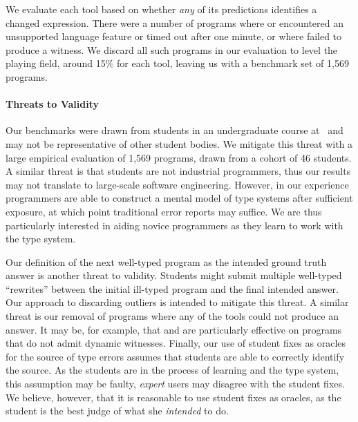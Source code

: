We evaluate each tool based on whether \emph{any} of its predictions
identifies a changed expression.
%
There were a number of programs where \mycroft or \sherrloc
encountered an unsupported language feature or timed out after one
minute, or where \toolname failed to produce a witness.
%
We discard all such programs in our evaluation to level the playing
field, around 15\% for each tool, leaving us with a benchmark set of
1,569 programs.

\paragraph{Threats to Validity}
Our benchmarks were drawn from students in an undergraduate course
at \ucsdbench\ and may not be representative of other student bodies.
%
We mitigate this threat with a large empirical evaluation of 1,569
programs, drawn from a cohort of 46 students.
%
A similar threat is that students are not industrial programmers, thus
our results may not translate to large-scale software engineering.
%
%
However, in our experience programmers are able to construct a mental
model of type systems after sufficient exposure, at which point
traditional error reports may suffice.
%
We are thus particularly interested in aiding novice programmers as
they learn to work with the type system.

Our definition of the next well-typed program as the intended ground
truth answer is another threat to validity. Students might submit
multiple well-typed ``rewrites'' between the initial ill-typed program
and the final intended answer.
%
Our approach to discarding outliers is intended to mitigate this threat.
%
A similar threat is our removal of programs where any of the tools could
not produce an answer.
%
It may be, for example, that \mycroft and \sherrloc are particularly
effective on programs that do not admit dynamic witnesses.
%
Finally, our use of student fixes as oracles for the source of type
errors assumes that students are able to correctly identify the source.
%
As the students are in the process of learning \ocaml and the type
system, this assumption may be faulty, \emph{expert} users may disagree
with the student fixes.
%
We believe, however, that it is reasonable to use student fixes as
oracles, as the student is the best judge of what she \emph{intended} to
do.

